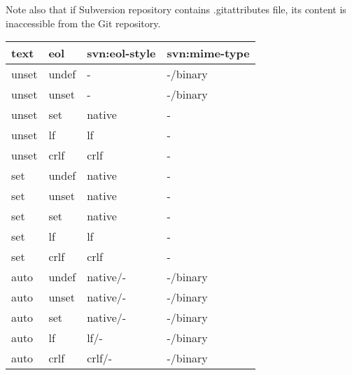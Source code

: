 Note also that if Subversion repository contains .gitattributes file, its content is inaccessible from the Git repository.

\begin{center}
\begin{tabular}{ | l | l | l | l |}
	\hline
	text  & eol      &  svn:eol-style  &  svn:mime-type \\ \hline
	unset & undef    &  -              &  -/binary \footnotemark[1] \\ \hline
	unset & unset    &  -              &  -/binary \footnotemark[2] \\ \hline
	unset & set      &  native         &  - \footnotemark[3] \\ \hline
	unset & lf       &  lf             &  - \\ \hline
	unset & crlf     &  crlf           &  - \\ \hline
	set   & undef    &  native         &  - \\ \hline
	set   & unset    &  native         &  - \footnotemark[4] \\ \hline
	set   & set      &  native         &  - \\ \hline
	set   & lf       &  lf             &  - \\ \hline
	set   & crlf     &  crlf           &  - \\ \hline
	auto  & undef    &  native/-       &  -/binary \footnotemark[1] \\ \hline
	auto  & unset    &  native/-       &  -/binary \footnotemark[5] \\ \hline
	auto  & set      &  native/-       &  -/binary \\ \hline
	auto  & lf       &  lf/-           &  -/binary \\ \hline
	auto  & crlf     &  crlf/-         &  -/binary \\ \hline
\end{tabular}
\label{eol_mime_git_to_svn}
\end{center}

